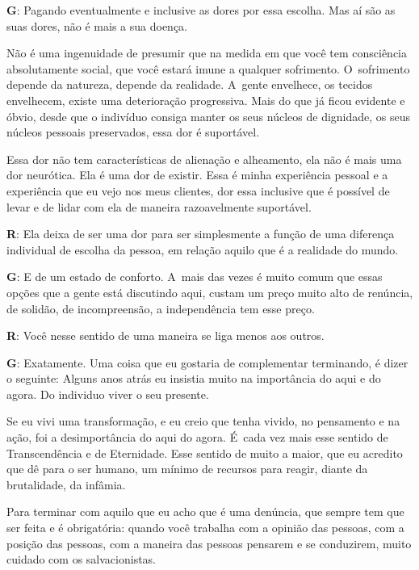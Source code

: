  

\textbf{G}: Pagando eventualmente e inclusive as dores por essa escolha.
Mas aí são as suas dores, não é mais a sua doença.

 

Não é uma ingenuidade de presumir que na medida em que você tem
consciência absolutamente social, que você estará imune a qualquer
sofrimento. O~sofrimento depende da natureza, depende da realidade. A~gente envelhece, os tecidos envelhecem, existe uma deterioração
progressiva. Mais do que já ficou evidente e óbvio, desde que o
indivíduo consiga manter os seus núcleos de dignidade, os seus núcleos
pessoais preservados, essa dor é suportável.

 

Essa dor não tem características de alienação e alheamento, ela não é
mais uma dor neurótica. Ela é uma dor de existir. Essa é minha
experiência pessoal e a experiência que eu vejo nos meus clientes, dor
essa inclusive que é possível de levar e de lidar com ela de maneira
razoavelmente suportável.

 

\textbf{R}: Ela deixa de ser uma dor para ser simplesmente a função de
uma diferença individual de escolha da pessoa, em relação aquilo que é a
realidade do mundo.

 

\textbf{G}: E de um estado de conforto. A~mais das vezes é muito comum
que essas opções que a gente está discutindo aqui, custam um preço muito
alto de renúncia, de solidão, de incompreensão, a independência tem esse
preço.

 

\textbf{R}: Você nesse sentido de uma maneira se liga menos aos outros.

 

\textbf{G}: Exatamente. Uma coisa que eu gostaria de complementar
terminando, é dizer o seguinte: Alguns anos atrás eu insistia muito na
importância do aqui e do agora. Do individuo viver o seu presente.

 

Se eu vivi uma transformação, e eu creio que tenha vivido, no pensamento
e na ação, foi a desimportância do aqui do agora. É~cada vez mais esse
sentido de Transcendência e de Eternidade. Esse sentido de muito a
maior, que eu acredito que dê para o ser humano, um mínimo de recursos
para reagir, diante da brutalidade, da infâmia.

 

Para terminar com aquilo que eu acho que é uma denúncia, que sempre tem
que ser feita e é obrigatória: quando você trabalha com a opinião das
pessoas, com a posição das pessoas, com a maneira das pessoas pensarem e
se conduzirem, muito cuidado com os salvacionistas.

